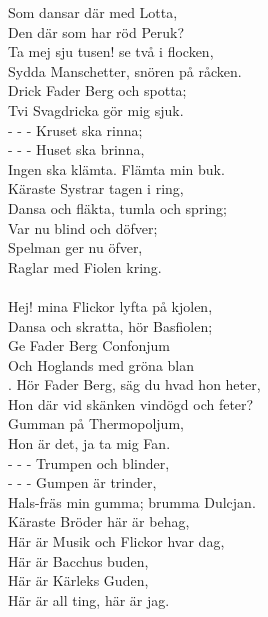 Som dansar där med Lotta,\\
Den där som har röd Peruk?\\
Ta mej sju tusen! se två i flocken,\\
Sydda Manschetter, snören på råcken.\\
Drick Fader Berg och spotta;\\
Tvi Svagdricka gör mig sjuk.\\
-  -  -  Kruset ska rinna;\\
-  -  -  Huset ska brinna,\\
Ingen ska klämta. Flämta min buk.\\
Käraste Systrar tagen i ring,\\
Dansa och fläkta, tumla och spring;\\
Var nu blind och döfver;\\
Spelman ger nu öfver,\\
Raglar med Fiolen kring.\\
\\
Hej! mina Flickor lyfta på kjolen,\\
Dansa och skratta, hör Basfiolen;\\
Ge Fader Berg Confonjum\\
Och Hoglands med gröna blan\\.
Hör Fader Berg, säg du hvad hon heter,\\
Hon där vid skänken vindögd och feter?\\
Gumman på Thermopoljum,\\
Hon är det, ja ta mig Fan.\\
-  -  -  Trumpen och blinder,\\
-  -  -  Gumpen är trinder,\\
Hals-fräs min gumma; brumma Dulcjan.\\
Käraste Bröder här är behag,\\
Här är Musik och Flickor hvar dag,\\
Här är Bacchus buden,\\
Här är Kärleks Guden,\\
Här är all ting, här är jag.
